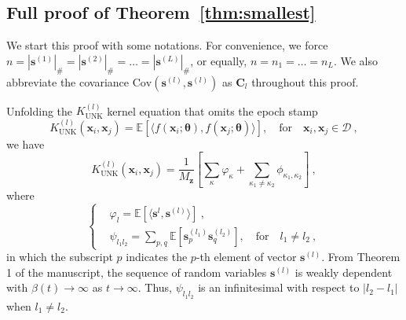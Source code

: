 \documentclass[review,10pt]{JMtemplate}
\begin{document}
\subsection{Full proof of Theorem~\ref{thm:smallest}}
We start this proof with some notations. For convenience, we force $n =|\boldsymbol{s}^{(1)}|_{\#} = |\boldsymbol{s}^{(2)}|_{\#} = \dots = |\boldsymbol{s}^{(L)}|_{\#}$, or equally, $n=n_1=\dots=n_L$. We also abbreviate the covariance $\mathrm{Cov}(\boldsymbol{s}^{(l)},\boldsymbol{s}^{(l)})$ as $\mathbf{C}_{l}$ throughout this proof.

Unfolding the $K_{\textrm{UNK}}^{(l)}$ kernel equation that omits the epoch stamp
\begin{equation} \label{eqn:kernel} 
K_{\textrm{UNK}}^{(l)} (\boldsymbol{x}_i,\boldsymbol{x}_j) = \mathbb{E}[\langle f(\boldsymbol{x}_i; \boldsymbol{\theta}), f(\boldsymbol{x}_j; \boldsymbol{\theta})\rangle], \quad\text{for}\quad \boldsymbol{x}_i, \boldsymbol{x}_j \in \mathcal{D} \ ,   
\end{equation}
we have 
\begin{equation} \label{eq:K_cov}
K_{\textrm{UNK}}^{(l)} (\boldsymbol{x}_i, \boldsymbol{x}_j) = \frac{1}{M_{\boldsymbol{z}}} \left[ \sum_{\kappa} \varphi_{\kappa} + \sum_{\kappa_1 \neq \kappa_2} \phi_{\kappa_1,\kappa_2} \right] \ ,
\end{equation}
where
\[
\left\{\begin{aligned}
	&\varphi_l = \mathbb{E} \left[ \langle \boldsymbol{s}^{l}, \boldsymbol{s}^{(l)} \rangle \right] \ , \\
	&\psi_{l_1l_2} = \sum\nolimits_{p,q} \mathbb{E} \left[ \boldsymbol{s}_p^{(l_1)} \boldsymbol{s}_q^{(l_2)} \right], \quad\text{for}\quad l_1 \neq l_2 \ ,
\end{aligned} \right.
\]
in which the subscript $p$ indicates the $p$-th element of vector $\boldsymbol{s}^{(l)}$. From Theorem 1 of the manuscript, the sequence of random variables $\boldsymbol{s}^{(l)}$ is weakly dependent with $\beta(t) \to \infty$ as $t\to \infty$. Thus, $\psi_{l_1l_2}$ is an infinitesimal with respect to $|l_2-l_1|$ when $l_1 \neq l_2$.
\end{document}
